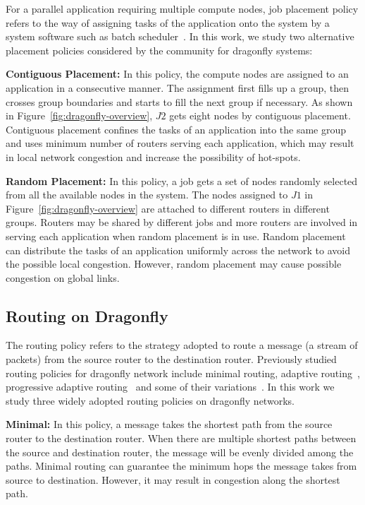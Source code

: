 For a parallel application requiring multiple compute nodes, job placement policy refers to the way of assigning tasks of the application onto the system by a system software such as batch scheduler~\cite{xu-cluster14}. In this work, we study two alternative placement policies considered by the community for dragonfly systems: 


\textbf{Contiguous Placement:} In this policy, the compute nodes are assigned to an application in a consecutive manner. The assignment first fills up a group, then crosses group boundaries and starts to fill the next group if necessary. As shown in Figure~\ref{fig:dragonfly-overview}, $J2$ gets eight nodes by contiguous placement. Contiguous placement confines the tasks of an application into the same group and uses minimum number of routers serving each application, which may result in local network congestion and increase the possibility of hot-spots. 

\textbf{Random Placement:} In this policy, a job gets a set of nodes randomly selected from all the available nodes in the system. The nodes assigned to $J1$ in Figure~\ref{fig:dragonfly-overview} are attached to different routers in different groups. Routers may be shared by different jobs and more routers are involved in serving each application when random placement is in use. Random placement can distribute the tasks of an application uniformly across the network to avoid the possible local congestion. However, random placement may cause possible congestion on global links.


\subsection{Routing on Dragonfly}
\label{sec:routing-schemes}

The routing policy refers to the strategy adopted to route a message (a stream of packets) from the source router to the destination router. Previously studied routing policies for dragonfly network include minimal routing, adaptive routing~\cite{dally-dragonfly}, progressive adaptive routing~\cite{jiang} and some of their variations~\cite{won-prog-adaptive}. In this work we study three widely adopted routing policies on dragonfly networks.

\textbf{Minimal:} In this policy, a message takes the shortest path from the source router to the destination router. When there are multiple shortest paths between the source and destination router, the message will be evenly divided among the paths. Minimal routing can guarantee the minimum hops the message takes from source to destination. However, it may result in congestion along the shortest path. 

